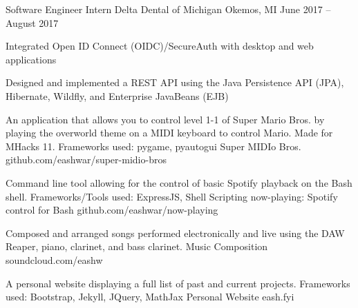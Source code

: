 \documentclass[]{awesome-cv}
\begin{document}
	\vspace{-4mm}
	\cventry
	{Software Engineer Intern}
	{Delta Dental of Michigan}
	{Okemos, MI}
	{June 2017 – August 2017}
	{\begin{cvitems}
		\item {Integrated Open ID Connect (OIDC)/SecureAuth with desktop and web applications}
		\item {Designed and implemented a REST API using the Java Persistence API (JPA), Hibernate, Wildfly, and Enterprise JavaBeans (EJB)}
		\end{cvitems}}


\vspace{-5mm}
\vspace{-2mm}

	\cventry
	{An application that allows you to control level 1-1 of Super Mario Bros. by playing the overworld theme on a MIDI keyboard to control Mario. Made for MHacks 11. Frameworks used: pygame, pyautogui}
	{Super MIDIo Bros.}
	{github.com/eashwar/super-midio-bros}
	{}
	{}

	\vspace{-6mm}
	\cventry
	{Command line tool allowing for the control of basic Spotify playback on the Bash shell. Frameworks/Tools used: ExpressJS, Shell Scripting}
	{now-playing: Spotify control for Bash}
	{github.com/eashwar/now-playing}
	{}
	{}
	
	\vspace{-6mm}
	\cventry
	{Composed and arranged songs performed electronically and live using the DAW Reaper, piano, clarinet, and bass clarinet.}
	{Music Composition}
	{soundcloud.com/eashw}
	{}
	{}
	
	\vspace{-6mm}
	\cventry
	{A personal website displaying a full list of past and current projects. Frameworks used: Bootstrap, Jekyll, JQuery, MathJax}
	{Personal Website}
	{eash.fyi}
	{}
	{}
	
\end{document}
